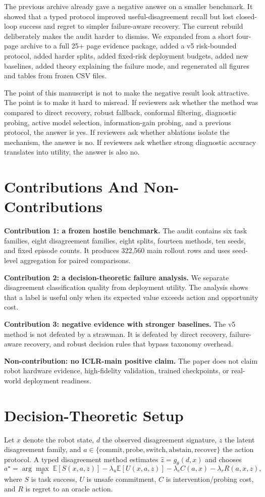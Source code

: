 \documentclass[11pt]{article}
\begin{document}
The previous archive already gave a negative answer on a smaller benchmark. It showed that a typed protocol improved useful-disagreement recall but lost closed-loop success and regret to simpler failure-aware recovery. The current rebuild deliberately makes the audit harder to dismiss. We expanded from a short four-page archive to a full 25+ page evidence package, added a v5 risk-bounded protocol, added harder splits, added fixed-risk deployment budgets, added new baselines, added theory explaining the failure mode, and regenerated all figures and tables from frozen CSV files.

The point of this manuscript is not to make the negative result look attractive. The point is to make it hard to misread. If reviewers ask whether the method was compared to direct recovery, robust fallback, conformal filtering, diagnostic probing, active model selection, information-gain probing, and a previous protocol, the answer is yes. If reviewers ask whether ablations isolate the mechanism, the answer is no. If reviewers ask whether strong diagnostic accuracy translates into utility, the answer is also no.

\section{Contributions And Non-Contributions}
\textbf{Contribution 1: a frozen hostile benchmark.} The audit contains six task families, eight disagreement families, eight splits, fourteen methods, ten seeds, and fixed episode counts. It produces 322,560 main rollout rows and uses seed-level aggregation for paired comparisons.

\textbf{Contribution 2: a decision-theoretic failure analysis.} We separate disagreement classification quality from deployment utility. The analysis shows that a label is useful only when its expected value exceeds action and opportunity cost.

\textbf{Contribution 3: negative evidence with stronger baselines.} The v5 method is not defeated by a strawman. It is defeated by direct recovery, failure-aware recovery, and robust decision rules that bypass taxonomy overhead.

\textbf{Non-contribution: no ICLR-main positive claim.} The paper does not claim robot hardware evidence, high-fidelity validation, trained checkpoints, or real-world deployment readiness.

\section{Decision-Theoretic Setup}
Let $x$ denote the robot state, $d$ the observed disagreement signature, $z$ the latent disagreement family, and $a \in \{\text{commit},\text{probe},\text{switch},\text{abstain},\text{recover}\}$ the action protocol. A typed disagreement method estimates $\hat z = g_\theta(d,x)$ and chooses
\[
  a^\star = \arg\max_a \; \mathbb{E}[S(x,a,z)] - \lambda_u \mathbb{E}[U(x,a,z)] - \lambda_c C(a,x) - \lambda_r R(a,x,z),
\]
where $S$ is task success, $U$ is unsafe commitment, $C$ is intervention/probing cost, and $R$ is regret to an oracle action.
\end{document}
